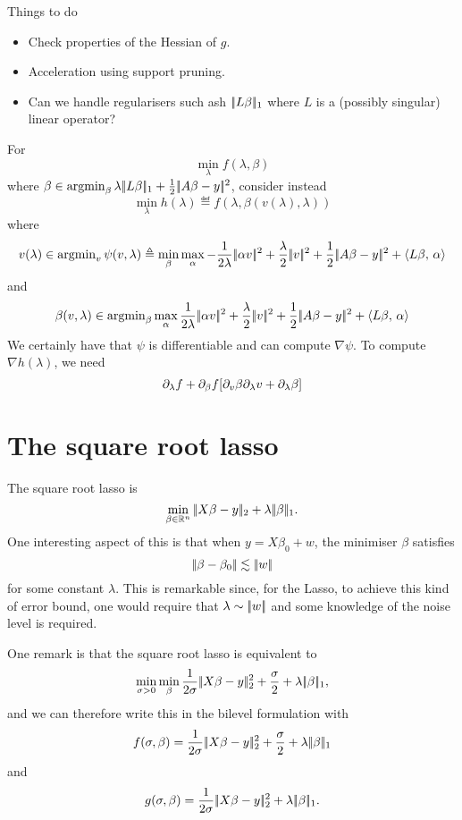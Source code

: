 \documentclass{article}
\begin{document}
Things to do
\begin{itemize}
\item Check properties of the Hessian of $g$.
\item Acceleration using support pruning. 
\item Can we handle regularisers such ash $|\!| L\beta |\!|_1$ where $L$ is a (possibly singular) linear operator?
\end{itemize}



For $$
\min_\lambda f(\lambda,\beta)
$$
where $\beta \in \operatorname{argmin}_\beta  \lambda|\!| L\beta |\!|_1 + \frac12 |\!| A\beta- y |\!|^2$,
consider instead
$$
\min_\lambda h(\lambda)\eqdef f(\lambda,\beta(v(\lambda),\lambda))
$$
where
$$
v(\lambda) \in \operatorname{argmin}_v \psi(v,\lambda)\triangleq \min_{\beta} \max_\alpha -\frac{1}{2\lambda}|\!| \alpha v |\!|^2 + \frac{\lambda}{2}|\!| v |\!|^2 + \frac12 |\!| A\beta - y |\!|^2+\langle  L\beta ,\,\alpha\rangle
$$
and
$$
\beta(v,\lambda) \in \operatorname{argmin}_{\beta}  \max_\alpha  \frac{1}{2\lambda}|\!| \alpha v |\!|^2 + \frac{\lambda}{2}|\!| v |\!|^2 + \frac12 |\!| A\beta - y |\!|^2+\langle  L\beta ,\,\alpha\rangle
$$
We certainly have that $\psi$ is differentiable and can compute $\nabla \psi$. To compute $\nabla h(\lambda)$, we need
$$
\partial_\lambda f + \partial_\beta f [\partial_v \beta \partial_\lambda v + \partial_\lambda \beta]
$$

\section{The square root lasso}
The square root lasso is
$$
\min_{\beta \in \mathbb{R}^n} |\!| X\beta - y |\!|_2 + \lambda |\!| \beta |\!|_1.
$$
One interesting aspect of this is that when $y = X\beta_0 + w$, the minimiser $\beta$ satisfies
$$
|\!| \beta -\beta_0 |\!| \lesssim |\!| w |\!|
$$
for some constant $\lambda$. This is remarkable since, for the Lasso, to achieve this kind of error bound, one would require that $\lambda\sim |\!| w |\!|$ and some knowledge of the noise level is required.

One remark is that the square root lasso is equivalent to
$$
\min_{\sigma>0} \min_{\beta}\frac{1}{2\sigma} |\!| X\beta-y |\!|_2^2 + \frac{\sigma}{2} + \lambda |\!| \beta |\!|_1,
$$
and we can therefore write this in the bilevel formulation with
$$f(\sigma, \beta) = \frac{1}{2\sigma} |\!| X\beta-y |\!|_2^2 + \frac{\sigma}{2} + \lambda |\!| \beta |\!|_1$$
and
$$g(\sigma,\beta) = \frac{1}{2\sigma} |\!| X\beta-y |\!|_2^2 + \lambda |\!| \beta |\!|_1.$$
\end{document}
